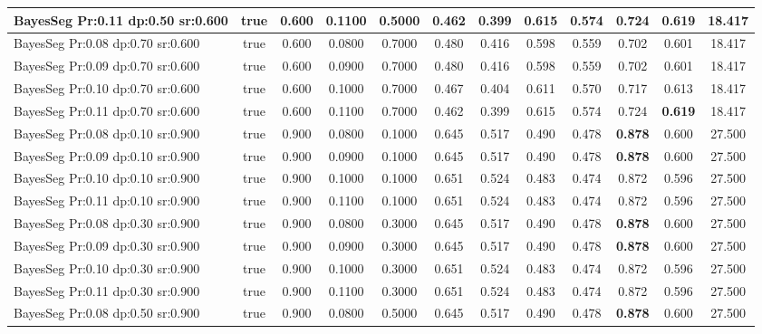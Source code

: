 \documentclass{article}
\begin{document}
\begin{longtable}[c]{|l|c|c|c|c|c|c|c|c|c|c|c|}
 BayesSeg Pr:0.11 dp:0.50 sr:0.600 & true & 0.600 & 0.1100 & 0.5000 & 0.462 & 0.399 & 0.615 & 0.574 & 0.724 & \cellcolor{gray!20} \textbf{0.619} & 18.417  \\ \hline 
 BayesSeg Pr:0.08 dp:0.70 sr:0.600 & true & 0.600 & 0.0800 & 0.7000 & 0.480 & 0.416 & 0.598 & 0.559 & 0.702 & 0.601 & 18.417  \\ \hline 
 BayesSeg Pr:0.09 dp:0.70 sr:0.600 & true & 0.600 & 0.0900 & 0.7000 & 0.480 & 0.416 & 0.598 & 0.559 & 0.702 & 0.601 & 18.417  \\ \hline 
 BayesSeg Pr:0.10 dp:0.70 sr:0.600 & true & 0.600 & 0.1000 & 0.7000 & 0.467 & 0.404 & 0.611 & 0.570 & 0.717 & 0.613 & 18.417  \\ \hline 
 BayesSeg Pr:0.11 dp:0.70 sr:0.600 & true & 0.600 & 0.1100 & 0.7000 & 0.462 & 0.399 & 0.615 & 0.574 & 0.724 & \cellcolor{gray!20} \textbf{0.619} & 18.417  \\ \hline 
 BayesSeg Pr:0.08 dp:0.10 sr:0.900 & true & 0.900 & 0.0800 & 0.1000 & 0.645 & 0.517 & 0.490 & 0.478 & \cellcolor{gray!20} \textbf{0.878} & 0.600 & 27.500  \\ \hline 
 BayesSeg Pr:0.09 dp:0.10 sr:0.900 & true & 0.900 & 0.0900 & 0.1000 & 0.645 & 0.517 & 0.490 & 0.478 & \cellcolor{gray!20} \textbf{0.878} & 0.600 & 27.500  \\ \hline 
 BayesSeg Pr:0.10 dp:0.10 sr:0.900 & true & 0.900 & 0.1000 & 0.1000 & 0.651 & 0.524 & 0.483 & 0.474 & 0.872 & 0.596 & 27.500  \\ \hline 
 BayesSeg Pr:0.11 dp:0.10 sr:0.900 & true & 0.900 & 0.1100 & 0.1000 & 0.651 & 0.524 & 0.483 & 0.474 & 0.872 & 0.596 & 27.500  \\ \hline 
 BayesSeg Pr:0.08 dp:0.30 sr:0.900 & true & 0.900 & 0.0800 & 0.3000 & 0.645 & 0.517 & 0.490 & 0.478 & \cellcolor{gray!20} \textbf{0.878} & 0.600 & 27.500  \\ \hline 
 BayesSeg Pr:0.09 dp:0.30 sr:0.900 & true & 0.900 & 0.0900 & 0.3000 & 0.645 & 0.517 & 0.490 & 0.478 & \cellcolor{gray!20} \textbf{0.878} & 0.600 & 27.500  \\ \hline 
 BayesSeg Pr:0.10 dp:0.30 sr:0.900 & true & 0.900 & 0.1000 & 0.3000 & 0.651 & 0.524 & 0.483 & 0.474 & 0.872 & 0.596 & 27.500  \\ \hline 
 BayesSeg Pr:0.11 dp:0.30 sr:0.900 & true & 0.900 & 0.1100 & 0.3000 & 0.651 & 0.524 & 0.483 & 0.474 & 0.872 & 0.596 & 27.500  \\ \hline 
 BayesSeg Pr:0.08 dp:0.50 sr:0.900 & true & 0.900 & 0.0800 & 0.5000 & 0.645 & 0.517 & 0.490 & 0.478 & \cellcolor{gray!20} \textbf{0.878} & 0.600 & 27.500  \\ \hline 

\end{longtable}
\end{document}
